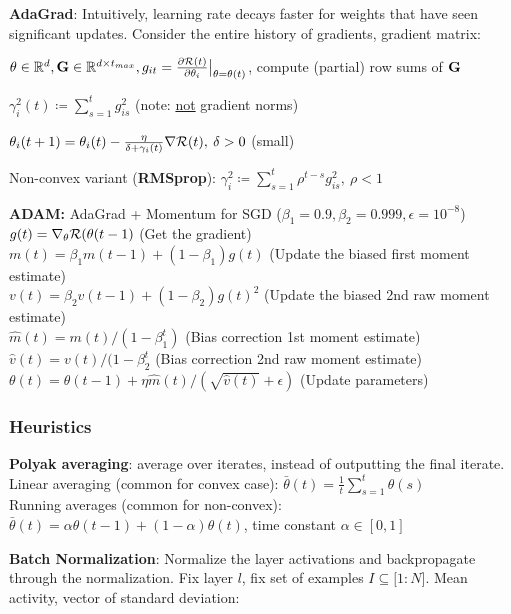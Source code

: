         \textbf{AdaGrad}: Intuitively, learning rate decays faster for weights that have seen significant updates. Consider the entire history of gradients, gradient matrix:
        
        $\theta\in\mathbb R^d,\mathbf G\in\mathbb R^{d\times t_{max}}, g_{it}=\frac{\partial\mathcal{R}(t)}{\partial\theta_i}\bigr|_{\theta=\theta(t)}$, compute (partial) row sums of $\mathbf G$
        
        \tab$\gamma^2_i(t)\coloneqq\sum\limits^t_{s=1}g^2_{is}$ (note: \underline{not} gradient norms)
        
        \tab$\theta_i(t+1)=\theta_i(t)-\frac{\eta}{\delta+\gamma_i(t)}\nabla\mathcal{R}(t),\> \delta>0$ (small) %
        
        Non-convex variant (\textbf{RMSprop}): $\gamma_i^2\coloneqq\sum\limits_{s=1}^t\rho^{t-s}g^2_{is},\>\rho<1$ 
        
        \textbf{ADAM:} AdaGrad + Momentum for SGD ($\beta_1=0.9, \beta_2=0.999, \epsilon=10^{-8}$)\\
        $g(t) = \nabla_\theta\mathcal{R}(\theta(t-1)$ (Get the gradient)\\
        $m(t)=\beta_1m(t-1)+(1-\beta_1)g(t)$ (Update the biased first moment estimate)\\
        $v(t)=\beta_2v(t-1)+(1-\beta_2)g(t)^2$ (Update the biased 2nd raw moment estimate)\\
        $\hat{m}(t)=m(t)/(1-\beta_1^t)$ (Bias correction 1st moment estimate)\\
        $\hat{v}(t)=v(t)/(1-\beta_2^t$ (Bias correction 2nd raw moment estimate)\\
        $\theta(t)=\theta(t-1)+\eta\hat{m}(t)/(\sqrt{\hat{v}(t)}+\epsilon)$ (Update parameters)

        
    
    \subsubsection{Heuristics}
    \label{ssub:heuristics}
        \textbf{Polyak averaging}: average over iterates, instead of outputting the final iterate.
        Linear averaging (common for convex case): $\bar{\theta}(t)=\frac{1}{t}\sum\limits_{s=1}^t\theta(s)$\\
        Running averages (common for non-convex): $\bar{\theta}(t)=\alpha\theta(t-1)+(1-\alpha)\theta(t)$, time constant $\alpha \in [0,1]$
        
        \textbf{Batch Normalization}: Normalize the layer activations and backpropagate through the normalization. Fix layer $l$, fix set of examples $I\subseteq\lbrack1:N\rbrack$. Mean activity, vector of standard deviation:\\
        
